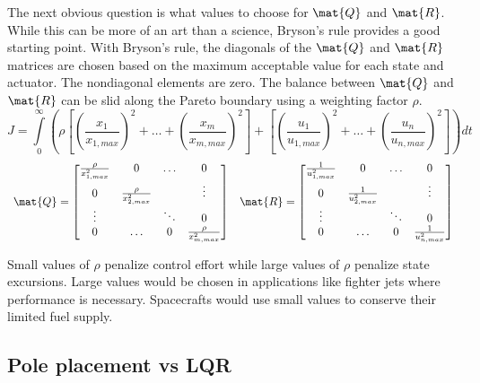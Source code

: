 The next obvious question is what values to choose for $\mat{Q}$ and $\mat{R}$.
While this can be more of an art than a science, Bryson's rule provides a good
starting point. With Bryson's rule, the diagonals of the $\mat{Q}$ and $\mat{R}$
matrices are chosen based on the maximum acceptable value for each \gls{state}
and actuator. The nondiagonal elements are zero. The balance between $\mat{Q}$
and $\mat{R}$ can be slid along the Pareto boundary using a weighting factor
$\rho$.
\begin{equation*}
  J = \int\limits_0^\infty \left(\rho \left[
    \left(\frac{x_1}{x_{1,max}}\right)^2 + \ldots +
    \left(\frac{x_m}{x_{m,max}}\right)^2\right] + \left[
    \left(\frac{u_1}{u_{1,max}}\right)^2 + \ldots +
    \left(\frac{u_n}{u_{n,max}}\right)^2\right]\right) dt
\end{equation*}
\begin{equation*}
  \begin{array}{cc}
    \mat{Q} = \begin{bmatrix}
      \frac{\rho}{x_{1,max}^2} & 0 & \ldots & 0 \\
      0 & \frac{\rho}{x_{2,max}^2} & & \vdots \\
      \vdots & & \ddots & 0 \\
      0 & \ldots & 0 & \frac{\rho}{x_{m,max}^2}
    \end{bmatrix} &
    \mat{R} = \begin{bmatrix}
      \frac{1}{u_{1,max}^2} & 0 & \ldots & 0 \\
      0 & \frac{1}{u_{2,max}^2} & & \vdots \\
      \vdots & & \ddots & 0 \\
      0 & \ldots & 0 & \frac{1}{u_{n,max}^2}
    \end{bmatrix}
  \end{array}
\end{equation*}

Small values of $\rho$ penalize \gls{control effort} while large values of
$\rho$ penalize \gls{state} excursions. Large values would be chosen in
applications like fighter jets where performance is necessary. Spacecrafts would
use small values to conserve their limited fuel supply.

\subsection{Pole placement vs LQR}

